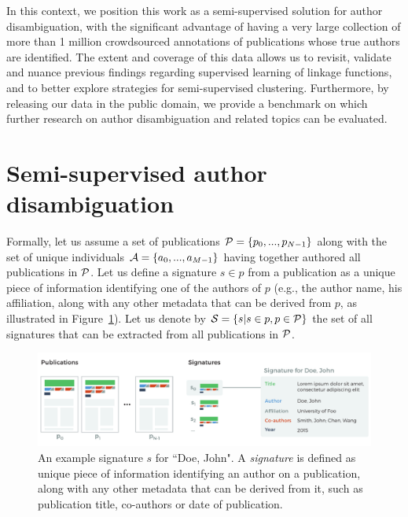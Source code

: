 \documentclass[runningheads,a4paper]{llncs}
\makeatletter
\newcommand*{\eg}{e.g.\@\xspace}
\makeatother
\begin{document}

In this context, we position this work as a
semi-supervised solution for author disambiguation, with the significant
advantage of having a very large collection of more than 1 million crowdsourced annotations
of publications whose true authors are identified.
The extent and coverage of this data allows us to revisit, validate and nuance previous
findings regarding supervised learning of linkage functions, and to better explore strategies
for semi-supervised clustering.
Furthermore, by releasing our data in the public domain, we provide a benchmark on
which further research on author disambiguation and related topics can be evaluated.



\section{Semi-supervised author disambiguation}
\label{methods}

Formally, let us assume a set of publications ${\cal P} = \{ p_0, ...,
p_{N-1}\}$ along with the set of unique individuals ${\cal A} = \{ a_0, ...,
a_{M-1}\}$ having together authored all publications in ${\cal P}$.  Let us
define a signature $s \in p$ from a publication as a unique piece of
information identifying one of the authors of $p$ (\eg, the author name, his
affiliation, along with any other metadata that can be derived from $p$, as illustrated in Figure~\ref{fig:signature}). Let us
denote by ${\cal S} = \{ s | s \in p, p \in {\cal P} \}$ the set of all
signatures that can be extracted from all publications in ${\cal P}$.

\begin{figure}
\centering
\includegraphics[width=\textwidth]{fig-pub-to-signature.pdf}
\caption{An example signature $s$ for ``Doe, John". A \textit{signature} is
defined as unique piece of information identifying an author on a publication,
along with any other metadata that can be derived from it, such as publication
title, co-authors or date of publication.}
\label{fig:signature}
\end{figure}
\end{document}
